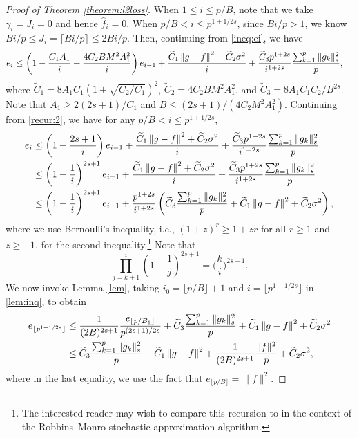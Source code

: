 \begin{proof}[Proof of Theorem \ref{theorem:l2loss}]
When $1\leq i \leq p/B$, note that we take $\gamma_i = J_i = 0$ and hence $\hat f_i = 0$.  When $p/B < i \leq p^{1+1/2s}$, since $Bi/p>1$, we know  $Bi/p \leq J_i = \lceil Bi/p \rceil \leq 2Bi/p$. Then, continuing from \eqref{ineq:ei}, we have
\begin{align}
    e_i & \leq \left(1-\frac{C_1A_1}{i}+\frac{4C_2BM^2A_1^2}{i}\right)e_{i-1}+ \frac{\widetilde C_1 \left\|g-f\right\|^2 + \widetilde C_2 \sigma^2}{i} + \frac{\widetilde C_3 p^{1+2s}}{i^{1+2s}}\frac{\sum_{k=1}^p\|g_k\|_s^2}{p},  \label{recur:2}
\end{align}
where $\tilde C_1 = 8A_1C_1(1+\sqrt{C_2/C_1})^2$, $\tilde C_2 = 4C_2BM^2A_1^2$, and $\tilde C_3 = 8A_1C_1C_2/B^{2s}$. Note that $A_1 \geq 2(2s+1)/C_1$ and $B \leq (2s+1)/(4C_2M^2A_1^2)$. Continuing from \eqref{recur:2}, we have for any $p/B < i \leq p^{1+1/2s}$,
\begin{align}
    e_i & \leq \left(1-\frac{2s+1}{i}\right)e_{i-1}+ \frac{\widetilde C_1 \left\|g-f\right\|^2 + \widetilde C_2\sigma^2}{i} + \frac{\widetilde C_3 p^{1+2s}}{i^{1+2s}}\frac{\sum_{k=1}^p\|g_k\|_s^2}{p} \notag\\
    & \leq \left(1-\frac{1}{i}\right)^{2s+1}e_{i-1}+ \frac{\widetilde C_1 \left\|g-f\right\|^2 + \widetilde C_2\sigma^2}{i} + \frac{\widetilde C_3 p^{1+2s}}{i^{1+2s}}\frac{\sum_{k=1}^p\|g_k\|_s^2}{p}\notag\\
    &\leq \left(1-\frac{1}{i}\right)^{2s+1}e_{i-1}+  \frac{ p^{1+2s}}{i^{1+2s}}\left(\widetilde C_3\frac{\sum_{k=1}^p\|g_k\|_s^2}{p} +\widetilde C_1 \left\|g-f\right\|^2 + \widetilde C_2\sigma^2 \right),
\end{align}
where we use Bernoulli's inequality, i.e., $(1+z)^r \geq 1+zr$ for all $ r \geq 1$ and $z \geq -1 $, for the second inequality.\footnote{The interested reader may wish to compare this recursion to \citep[Lemma 1]{chung1954stochastic} in the context of the Robbins–Monro stochastic approximation algorithm.} Note that 
$$
\prod_{j=k+1}^i \left(1-\frac{1}{j}\right)^{2s+1} = \bigg(\frac{k}{i}\bigg)^{2s+1}.
$$
We now invoke Lemma \ref{lem}, taking $i_0 = \lfloor p/B \rfloor+1$ and $i = \lfloor p^{1+1/2s} \rfloor$  in \eqref{lem:inq}, to obtain
\begin{align}
    e_{\lfloor p^{1+1/2s} \rfloor} &\leq \frac{1}{(2B)^{2s+1}}\frac{e_{\lfloor p/B_1 \rfloor}}{p^{(2s+1)/2s}} + 
    \widetilde C_3\frac{\sum_{k=1}^p\|g_k\|_s^2}{p} +\widetilde C_1 \left\|g-f\right\|^2 + \widetilde C_2\sigma^2\notag\\
    &\leq \widetilde C_3\frac{\sum_{k=1}^p\|g_k\|_s^2}{p} +\widetilde C_1 \left\|g-f\right\|^2 + \frac{1}{(2B)^{2s+1}}\frac{\|f\|^2}{p} +\widetilde C_2\sigma^2, \label{stage2}
\end{align}
where in the last equality, we use the fact that $e_{\lfloor p/B \rfloor} = \|f\|^2 $.


\end{proof}
